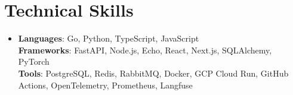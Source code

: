 \documentclass[letterpaper,11pt]{article}
\begin{document}
\section{Technical Skills}
\begin{itemize}[leftmargin=0.15in, label={}, topsep=0pt, itemsep=0pt, parsep=0pt, partopsep=0pt]
  \item{\fontsize{9.6pt}{10.0pt}\selectfont
   \textbf{Languages}{: Go, Python, TypeScript, JavaScript} \\
   \textbf{Frameworks}{: FastAPI, Node.js, Echo, React, Next.js, SQLAlchemy, PyTorch} \\
   \textbf{Tools}{: PostgreSQL, Redis, RabbitMQ, Docker, GCP Cloud Run, GitHub Actions, OpenTelemetry, Prometheus, Langfuse} \\
  }
\end{itemize}
\end{document}
